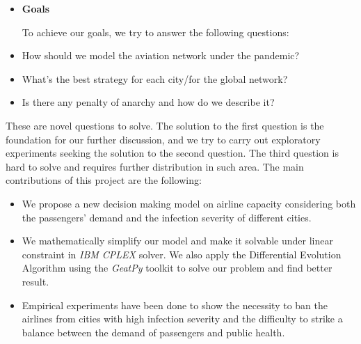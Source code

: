 \documentclass[11pt,twocolumn]{article}
\begin{document}
\begin{itemize}    
    \item \textbf{Goals}
    
    To achieve our goals, we try to answer the following questions:
\end{itemize}



\begin{itemize}    
    \item How should we model the aviation network under the pandemic?
    \item What's the best strategy for each city/for the global network?
    \item Is there any penalty of anarchy and how do we describe it?
\end{itemize}


These are novel questions to solve. The solution to the first question is the foundation for our further discussion, and we try to carry out exploratory experiments seeking the solution to the second question. The third question is hard to solve and requires further distribution in such area. The main contributions of this project are the following:
\begin{itemize}
    \item We propose a new decision making model on airline capacity considering both the passengers' demand and the infection severity of different cities.
    \item We mathematically simplify our model and make it solvable under linear constraint in \emph{IBM CPLEX} solver. We also apply the Differential Evolution Algorithm using the \emph{GeatPy}\cite{geatpy} toolkit to solve our problem and find better result.
    
    \item Empirical experiments have been done to show the necessity to ban the airlines from cities with high infection severity and the difficulty to strike a balance between the demand of passengers and public health. 
\end{itemize}
\end{document}

